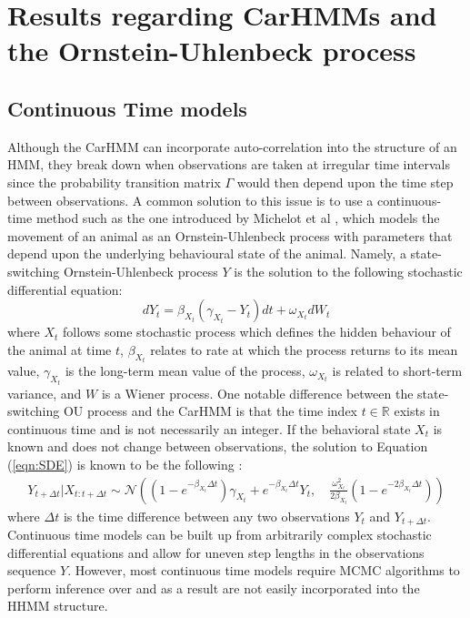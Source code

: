 
\section{Results regarding CarHMMs and the Ornstein-Uhlenbeck process}

\subsection{Continuous Time models}

Although the CarHMM can incorporate auto-correlation into the structure of an HMM, they break down when observations are taken at irregular time intervals since the probability transition matrix $\Gamma$ would then depend upon the time step between observations. A common solution to this issue is to use a continuous-time method such as the one introduced by Michelot et al \cite{Michelot:2019}, which models the movement of an animal as an Ornstein-Uhlenbeck process with parameters that depend upon the underlying behavioural state of the animal. Namely, a state-switching Ornstein-Uhlenbeck process $Y$ is the solution to the following stochastic differential equation:
%
\begin{equation}
    \label{eqn:SDE}
    dY_t = \beta_{X_t}(\gamma_{X_t} - Y_t)dt + \omega_{X_t} dW_t
\end{equation}
%
where $X_t$ follows some stochastic process which defines the hidden behaviour of the animal at time $t$, $\beta_{X_t}$ relates to rate at which the process returns to its mean value, $\gamma_{X_t}$ is the long-term mean value of the process, $\omega_{X_t}$ is related to short-term variance, and $W$ is a Wiener process. One notable difference between the state-switching OU process and the CarHMM is that the time index $t \in \mathbb{R}$ exists in continuous time and is not necessarily an integer. If the behavioral state $X_t$ is known and does not change between observations, the solution to Equation (\ref{eqn:SDE}) is known to be the following \cite{Michelot:2019}:
%
\begin{align}
Y_{t+\Delta t} | X_{t:t+\Delta t} \sim \mathcal{N}\left((1-e^{-\beta_{X_t}\Delta t})\gamma_{X_t} + e^{-\beta_{X_t}\Delta t} Y_t,\quad \frac{\omega_{X_t}^2}{2\beta_{X_t}} (1-e^{-2\beta_{X_t}\Delta t})\right)
\label{eqn:OU_sol}
\end{align}
%
where $\Delta t$ is the time difference between any two observations $Y_t$ and $Y_{t+\Delta t}$. Continuous time models can be built up from arbitrarily complex stochastic differential equations and allow for uneven step lengths in the observations sequence $Y$. However, most continuous time models require MCMC algorithms to perform inference over and as a result are not easily incorporated into the HHMM structure.

